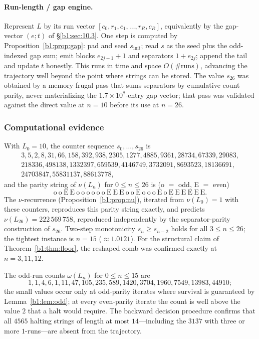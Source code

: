\documentclass[a4paper]{article}
\theoremstyle{plain}
\theoremstyle{definition}
\theoremstyle{remark}
\begin{document}
\paragraph{Run-length / gap engine.} Represent $L$ by its run vector $[c_0,r_1,c_1,\dots,r_R,c_R]$, equivalently by the gap-vector $(e;t)$ of \S\ref{b1:sec:10.3}. One step is computed by Proposition~\ref{b1:prop:gap}: pad and seed $s_{\mathrm{init}}$; read $s$ as the seed plus the odd-indexed gap sum; emit blocks $e_{2j-1}+1$ and separators $1+e_{2j}$; append the tail and update $t$ honestly. This runs in time and space $O(\#\text{runs})$, advancing the trajectory well beyond the point where strings can be stored. The value $s_{26}$ was obtained by a memory-frugal pass that sums separators by cumulative-count parity, never materializing the $1.7\times 10^8$-entry gap vector; that pass was validated against the direct value at $n=10$ before its use at $n=26$.

\subsubsection{Computational evidence}\label{b1:app:evidence}
With $L_0=10$, the counter sequence $s_0,\dots,s_{26}$ is
\begin{multline*}
3,5,2,8,31,66,158,392,938,2305,1277,4885,9361,28734,67339,29083,\\
218336,498138,1332397,659539,4146749,3732091,8693523,18136691,\\
24703847,55831137,88613778,
\end{multline*}
and the parity string of $\nu(L_n)$ for $0\le n\le 26$ is (o $=$ odd, E $=$ even)
\[ \mathrm{o\ o\ E\ E\ o\ o\ o\ o\ o\ o\ E\ E\ E\ o\ o\ E\ o\ o\ o\ E\ o\ E\ E\ E\ E\ E\ E.} \]
The $\nu$-recurrence (Proposition~\ref{b1:prop:nu}), iterated from $\nu(L_0)=1$ with these counters, reproduces this parity string exactly, and predicts $\nu(L_{26})=222\,569\,758$, reproduced independently by the separator-parity construction of $s_{26}$. Two-step monotonicity $s_n\ge s_{n-2}$ holds for all $3\le n\le 26$; the tightest instance is $n=15$ ($\approx 1.0121$). For the structural claim of Theorem~\ref{b1:thm:floor}, the reshaped comb was confirmed exactly at $n=3,11,12$.

The odd-run counts $\omega(L_n)$ for $0\le n\le 15$ are
\[ 1,1,4,6,1,11,47,105,235,589,1420,3704,1960,7549,13983,44910; \]
the small values occur only at odd-parity iterates where survival is guaranteed by Lemma~\ref{b1:lem:odd}; at every even-parity iterate the count is well above the value $2$ that a halt would require. The backward decision procedure confirms that all $4565$ halting strings of length at most $14$---including the $3137$ with three or more $1$-runs---are absent from the trajectory.
\end{document}

